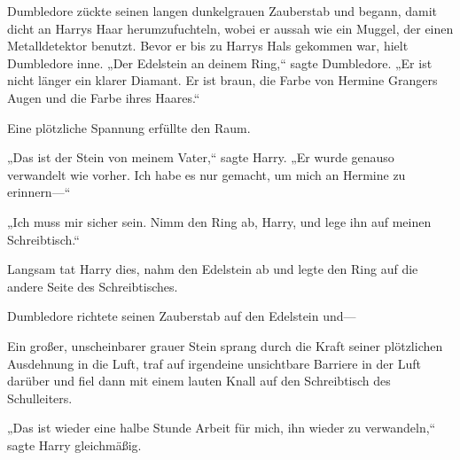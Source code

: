 
Dumbledore zückte seinen langen dunkelgrauen Zauberstab und begann, damit dicht an Harrys Haar herumzufuchteln, wobei er aussah wie ein Muggel, der einen Metalldetektor benutzt. Bevor er bis zu Harrys Hals gekommen war, hielt Dumbledore inne. „Der Edelstein an deinem Ring,“ sagte Dumbledore. „Er ist nicht länger ein klarer Diamant. Er ist braun, die Farbe von Hermine Grangers Augen und die Farbe ihres Haares.“

Eine plötzliche Spannung erfüllte den Raum.

„Das ist der Stein von meinem Vater,“ sagte Harry. „Er wurde genauso verwandelt wie vorher. Ich habe es nur gemacht, um mich an Hermine zu erinnern—“

„Ich muss mir sicher sein. Nimm den Ring ab, Harry, und lege ihn auf meinen Schreibtisch.“

Langsam tat Harry dies, nahm den Edelstein ab und legte den Ring auf die andere Seite des Schreibtisches.

Dumbledore richtete seinen Zauberstab auf den Edelstein und—

Ein großer, unscheinbarer grauer Stein sprang durch die Kraft seiner plötzlichen Ausdehnung in die Luft, traf auf irgendeine unsichtbare Barriere in der Luft darüber und fiel dann mit einem lauten Knall auf den Schreibtisch des Schulleiters.

„Das ist wieder eine halbe Stunde Arbeit für mich, ihn wieder zu verwandeln,“ sagte Harry gleichmäßig.

